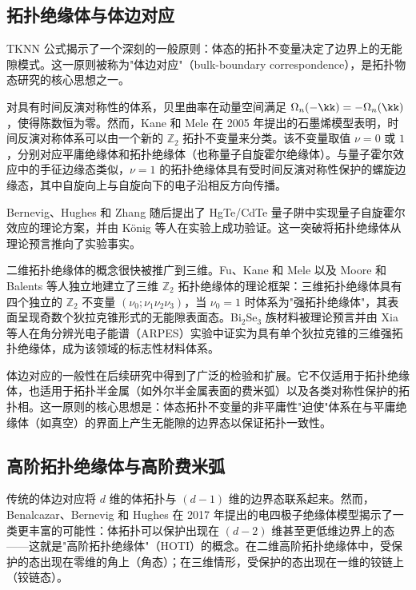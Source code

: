 \subsection{拓扑绝缘体与体边对应}

TKNN 公式揭示了一个深刻的一般原则：体态的拓扑不变量决定了边界上的无能隙模式。这一原则被称为"体边对应"（bulk-boundary correspondence），是拓扑物态研究的核心思想之一。

对具有时间反演对称性的体系，贝里曲率在动量空间满足 $\Omega_n(-\kk) = -\Omega_n(\kk)$，使得陈数恒为零。然而，Kane 和 Mele 在 2005 年提出的石墨烯模型表明，时间反演对称体系可以由一个新的 $\mathbb{Z}_2$ 拓扑不变量来分类\cite{PhysRevLett.95.146802}。该不变量取值 $\nu = 0$ 或 $1$，分别对应平庸绝缘体和拓扑绝缘体（也称量子自旋霍尔绝缘体）。与量子霍尔效应中的手征边缘态类似，$\nu = 1$ 的拓扑绝缘体具有受时间反演对称性保护的螺旋边缘态，其中自旋向上与自旋向下的电子沿相反方向传播。

Bernevig、Hughes 和 Zhang 随后提出了 HgTe/CdTe 量子阱中实现量子自旋霍尔效应的理论方案\cite{bernevig2006quantum}，并由 König 等人在实验上成功验证\cite{konig2007quantum}。这一突破将拓扑绝缘体从理论预言推向了实验事实。

二维拓扑绝缘体的概念很快被推广到三维。Fu、Kane 和 Mele 以及 Moore 和 Balents 等人独立地建立了三维 $\mathbb{Z}_2$ 拓扑绝缘体的理论框架\cite{PhysRevB.76.045302,PhysRevB.75.121306}：三维拓扑绝缘体具有四个独立的 $\mathbb{Z}_2$ 不变量 $(\nu_0;\nu_1\nu_2\nu_3)$，当 $\nu_0 = 1$ 时体系为"强拓扑绝缘体"，其表面呈现奇数个狄拉克锥形式的无能隙表面态。Bi$_2$Se$_3$ 族材料被理论预言\cite{hjzhang}并由 Xia 等人在角分辨光电子能谱（ARPES）实验中证实\cite{xia2009observation}为具有单个狄拉克锥的三维强拓扑绝缘体，成为该领域的标志性材料体系。

体边对应的一般性在后续研究中得到了广泛的检验和扩展。它不仅适用于拓扑绝缘体，也适用于拓扑半金属（如外尔半金属表面的费米弧\cite{WanXG}）以及各类对称性保护的拓扑相。这一原则的核心思想是：体态拓扑不变量的非平庸性"迫使"体系在与平庸绝缘体（如真空）的界面上产生无能隙的边界态以保证拓扑一致性。

\subsection{高阶拓扑绝缘体与高阶费米弧}

传统的体边对应将 $d$ 维的体拓扑与 $(d-1)$ 维的边界态联系起来。然而，Benalcazar、Bernevig 和 Hughes 在 2017 年提出的电四极子绝缘体模型\cite{bernevig2017quantizedNBP}揭示了一类更丰富的可能性：体拓扑可以保护出现在 $(d-2)$ 维甚至更低维边界上的态——这就是"高阶拓扑绝缘体"（HOTI）的概念。在二维高阶拓扑绝缘体中，受保护的态出现在零维的角上（角态）；在三维情形，受保护的态出现在一维的铰链上（铰链态）。

